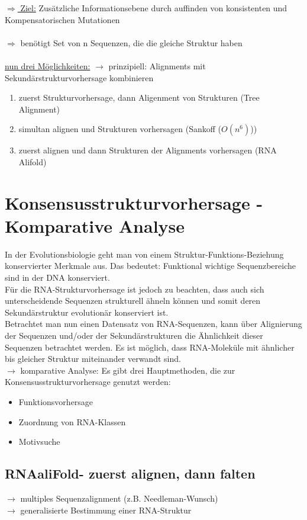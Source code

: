 \underline{$\Rightarrow$ Ziel:} Zusätzliche Informationsebene durch auffinden von konsistenten und Kompensatorischen Mutationen
\\\\
$\Rightarrow$ benötigt Set von n Sequenzen, die die gleiche Struktur haben
\\\\
\underline{nun drei Möglichkeiten:}
$\rightarrow$ prinzipiell: Alignments mit Sekundärstrukturvorhersage kombinieren
\begin{enumerate}
	\item zuerst Strukturvorhersage, dann Aligenment von Strukturen (Tree Alignment)
	\item simultan alignen und Strukturen vorhersagen (Sankoff ($O(n^6)$))
	\item zuerst alignen und dann Strukturen der Alignments vorhersagen (RNA Alifold)
\end{enumerate}

\section{Konsensusstrukturvorhersage - Komparative Analyse}

In der Evolutionsbiologie geht man von einem Struktur-Funktions-Beziehung konservierter Merkmale aus. Das bedeutet: Funktional wichtige Sequenzbereiche sind in der DNA konserviert. \\
Für die RNA-Strukturvorhersage ist jedoch zu beachten, dass auch sich unterscheidende Sequenzen strukturell ähneln können und somit deren Sekundärstruktur evolutionär konserviert ist. \\
Betrachtet man nun einen Datensatz von RNA-Sequenzen, kann über Alignierung der Sequenzen und/oder der Sekundärstrukturen die Ähnlichkeit dieser Sequenzen betrachtet werden. Es ist möglich, dass RNA-Moleküle mit ähnlicher bis gleicher Struktur miteinander verwandt sind. \\
$\rightarrow$ komparative Analyse:
Es gibt drei Hauptmethoden, die zur Konsensusstrukturvorhersage genutzt werden: 
\begin{itemize}
\item Funktionsvorhersage \\
\item Zuordnung von RNA-Klassen \\
\item Motivsuche
\end{itemize}

\subsection{RNAaliFold- zuerst alignen, dann falten}
$\rightarrow$ multiples Sequenzalignment (z.B. Needleman-Wunsch) \\
$\rightarrow$ generalisierte Bestimmung einer RNA-Struktur \\

